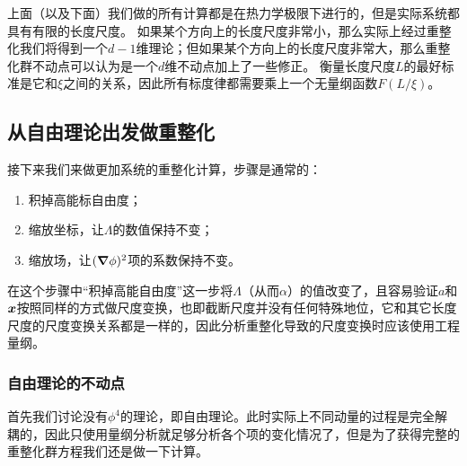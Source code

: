 \documentclass[hyperref, UTF8, a4paper]{ctexart}
\begin{document}
上面（以及下面）我们做的所有计算都是在热力学极限下进行的，但是实际系统都具有有限的长度尺度。
如果某个方向上的长度尺度非常小，那么实际上经过重整化我们将得到一个$d-1$维理论；但如果某个方向上的长度尺度非常大，那么重整化群不动点可以认为是一个$d$维不动点加上了一些修正。
衡量长度尺度$L$的最好标准是它和$\xi$之间的关系，因此所有标度律都需要乘上一个无量纲函数$F(L/\xi)$。

\subsection{从自由理论出发做重整化}

接下来我们来做更加系统的重整化计算，步骤是通常的：
\begin{enumerate}
    \item 积掉高能标自由度；
    \item 缩放坐标，让$\Lambda$的数值保持不变；
    \item 缩放场，让$(\grad{\phi})^2$项的系数保持不变。
\end{enumerate}
在这个步骤中“积掉高能自由度”这一步将$\Lambda$（从而$\alpha$）的值改变了，且容易验证$a$和$\vb*{x}$按照同样的方式做尺度变换，也即截断尺度并没有任何特殊地位，它和其它长度尺度的尺度变换关系都是一样的，因此分析重整化导致的尺度变换时应该使用工程量纲。

\subsubsection{自由理论的不动点}

首先我们讨论没有$\phi^4$的理论，即自由理论。此时实际上不同动量的过程是完全解耦的，因此只使用量纲分析就足够分析各个项的变化情况了，但是为了获得完整的重整化群方程我们还是做一下计算。
\end{document}
